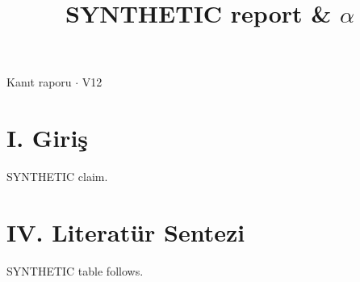 \documentclass[journal]{IEEEtran}
\begin{document}
\renewcommand{\abstractname}{Özet}
\renewcommand{\IEEEkeywordsname}{Dizin Terimleri}
\renewcommand{\refname}{Kaynaklar}

\title{SYNTHETIC report \& \ensuremath{\alpha}}

\maketitle

\noindent Kanıt raporu \ensuremath{\cdot} V12

\section*{I. Giriş}

SYNTHETIC claim. \cite{Synth26}

\section*{IV. Literatür Sentezi}

SYNTHETIC table follows.
\end{document}

